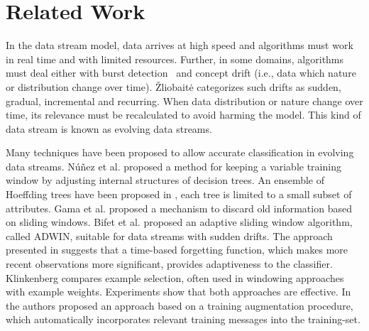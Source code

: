 \section{Related Work}

In the data stream model, data arrives at high speed and algorithms must
work in real time and with limited resources. Further, in some domains,
algorithms must deal either with burst detection~\cite{shasha} and concept drift (i.e.,
data which nature or distribution change over time). \v{Z}liobait\.{e}
\cite{DBLP:journals/corr/abs-1010-4784} categorizes such drifts as sudden, gradual,
incremental and recurring. When data distribution or nature change over time, its relevance
must be recalculated to avoid harming the model. This kind of data stream is known as
evolving data streams.

Many techniques have been proposed to allow accurate classification in evolving data
streams.  N\'{u}\~{n}ez et al. \cite{Nunez:2007:LEU:1314498.1390328} proposed a
method for keeping a variable training window by adjusting internal
structures of decision trees. An ensemble of Hoeffding trees have been proposed
in \cite{Bifet:2012:ERH:2089094.2089106}, each tree is limited to a small subset of
attributes. Gama et al.\cite{Gama2009a} proposed a mechanism to discard old
information based on sliding windows. Bifet et al.  \cite{Bifet2007,
Bifet:2009:ALE:1617420.1617445} proposed an adaptive sliding window algorithm,
called ADWIN, suitable for data streams with sudden drifts.
The approach presented in
\cite{Koychev00gradualforgetting} suggests that a time-based
forgetting function, which makes more recent observations more significant,
provides adaptiveness to the classifier.
Klinkenberg \cite{Klinkenberg:2004:LDC:1293831.1293836} compares example selection, often
used in windowing approaches with example weights. Experiments
show that both approaches are effective.
In \cite{sigir} the
authors proposed an approach based on a training augmentation procedure, which
automatically incorporates
relevant training messages into the training-set.

